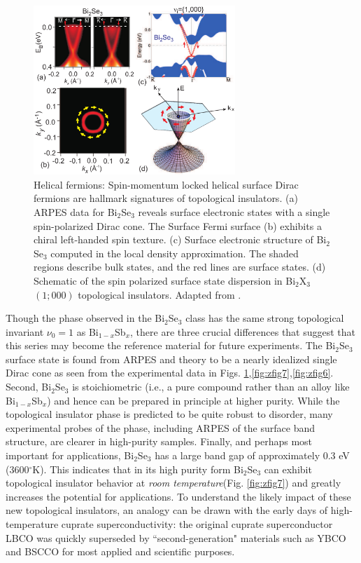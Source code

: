 \documentclass[twocolumn,floatfix,showpacs,rmp,aps]{revtex4}
\begin{document}
	\begin{figure}
		\includegraphics[width=3in]{Fig12}
		\caption{\label{fig:zfig4}
			Helical fermions: Spin-momentum
			locked helical surface Dirac fermions are hallmark signatures of
			topological insulators.  (a) ARPES data for Bi$_2$Se$_3$ reveals
			surface electronic states with a single
			spin-polarized Dirac cone. The Surface Fermi surface (b) exhibits a chiral
			left-handed spin texture.  (c) Surface electronic structure of
			Bi$_2$Se$_3$ computed in the local density approximation.  The shaded
			regions describe bulk states, and the red lines are surface states.
			(d) Schematic of the spin polarized surface state dispersion in
			Bi$_2$X$_3$ $(1;000)$ topological insulators.  Adapted from .}
	\end{figure}
	
	Though the phase observed in the Bi$_2$Se$_3$ class has the same
	strong topological invariant $\nu_0=1$ as Bi$_{1-x}$Sb$_x$,
	there are three
	crucial differences that suggest that this series may become the
	reference material for future experiments. The
	Bi$_2$Se$_3$ surface state is found from ARPES and theory to be
	a nearly idealized single Dirac cone as seen from the experimental
	data in Figs. \ref{fig:zfig4},\ref{fig:zfig7},\ref{fig:zfig6}.
	Second, Bi$_2$Se$_3$ is stoichiometric (i.e., a pure
	compound rather than an alloy like Bi$_{1-x}$Sb$_x$) and hence can be
	prepared in principle at higher purity.  While the topological
	insulator phase is predicted to be quite robust to disorder, many
	experimental probes of the phase, including ARPES of the surface band
	structure, are clearer in high-purity samples. Finally, and perhaps
	most important for applications, Bi$_2$Se$_3$ has a large band gap of
	approximately 0.3 eV (3600$^\circ$K).  This indicates that in its high
	purity form Bi$_2$Se$_3$ can exhibit topological insulator behavior at
	{\it room temperature}(Fig. \ref{fig:zfig7})
	and greatly increases the
	potential for applications. To understand the likely impact
	of these new topological insulators, an analogy can be drawn with the
	early days of high-temperature cuprate superconductivity: the
	original cuprate superconductor LBCO was quickly superseded by
	``second-generation" materials such as YBCO and BSCCO for most applied
	and scientific purposes.
	
\end{document}

